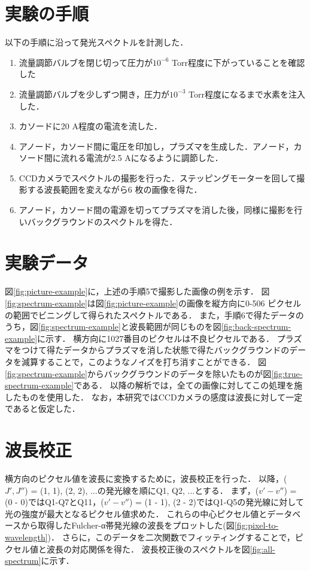 \section{実験の手順}
以下の手順に沿って発光スペクトルを計測した．
\begin{enumerate}
    \item 流量調節バルブを閉じ切って圧力が$10^{-6}$ Torr程度に下がっていることを確認した
    \item 流量調節バルブを少しずつ開き，圧力が$10^{-3}$ Torr程度になるまで水素を注入した．
    \item カソードに20 A程度の電流を流した．
    \item アノード，カソード間に電圧を印加し，プラズマを生成した．アノード，カソード間に流れる電流が2.5 Aになるように調節した．
    \item CCDカメラでスペクトルの撮影を行った．ステッピングモーターを回して撮影する波長範囲を変えながら6 枚の画像を得た．
    \item アノード，カソード間の電源を切ってプラズマを消した後，同様に撮影を行いバックグラウンドのスペクトルを得た．
\end{enumerate}

\section{実験データ}
図\ref{fig:picture-example}に，上述の手順5で撮影した画像の例を示す．
図\ref{fig:spectrum-example}は図\ref{fig:picture-example}の画像を縦方向に0-506 ピクセルの範囲でビニングして得られたスペクトルである．
また，手順6で得たデータのうち，図\ref{fig:spectrum-example}と波長範囲が同じものを図\ref{fig:back-spectrum-example}に示す．
横方向に1027番目のピクセルは不良ピクセルである．
プラズマをつけて得たデータからプラズマを消した状態で得たバックグラウンドのデータを減算することで，このようなノイズを打ち消すことができる．
図\ref{fig:spectrum-example}からバックグラウンドのデータを除いたものが図\ref{fig:true-spectrum-example}である．
以降の解析では，全ての画像に対してこの処理を施したものを使用した．
なお，本研究ではCCDカメラの感度は波長に対して一定であると仮定した．

\section{波長校正}
横方向のピクセル値を波長に変換するために，波長校正を行った．
以降，($J', J''$) = (1, 1), (2, 2), ...の発光線を順にQ1, Q2, ...とする．
まず，($v'-v''$) = (0 - 0)ではQ1-Q7とQ11，($v'-v''$) = (1 - 1), (2 - 2)ではQ1-Q5の発光線に対して光の強度が最大となるピクセル値求めた．
これらの中心ピクセル値とデータベース\cite{H2-spectrum-data}から取得したFulcher-α帯発光線の波長をプロットした(図\ref{fig:pixel-to-wavelength})．
さらに，このデータを二次関数でフィッティングすることで，ピクセル値と波長の対応関係を得た．
波長校正後のスペクトルを図\ref{fig:all-spectrum}に示す．
